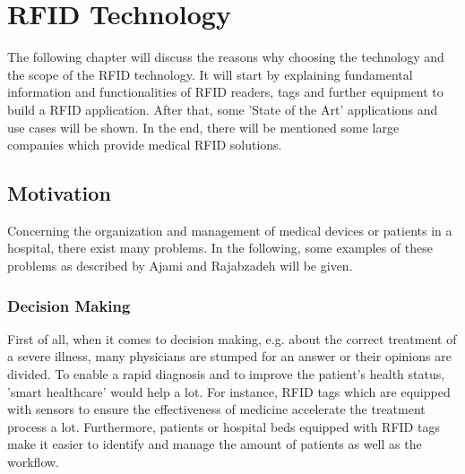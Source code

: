 
\chapter{RFID Technology}

The following chapter will discuss the reasons why choosing the technology and the scope of the RFID technology. It will start by explaining fundamental information and functionalities of RFID readers, tags and further equipment to build a RFID application. After that, some 'State of the Art' applications and use cases will be shown. In the end, there will be mentioned some large companies which provide medical RFID solutions.

\section{Motivation}

Concerning the organization and management of medical devices or patients in a hospital, there exist many problems. In the following, some examples of these problems as described by Ajami and Rajabzadeh \cite{ncbi} will be given.

\subsection{Decision Making}
First of all, when it comes to decision making, e.g. about the correct treatment of a severe illness, many physicians are stumped for an answer or their opinions are divided. To enable a rapid diagnosis and to improve the patient's health status, 'smart healthcare' \cite{henrici} would help a lot. For instance, RFID tags which are equipped with sensors to ensure the effectiveness of medicine accelerate the treatment process a lot. Furthermore, patients or hospital beds equipped with RFID tags make it easier to identify and manage the amount of patients as well as the workflow.

